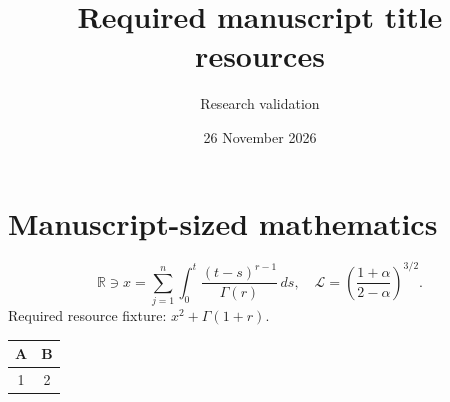 \documentclass[11pt,a4paper]{article}
\begin{document}
\title{Required manuscript title resources}
\author{Research validation}\date{26 November 2026}
\maketitle
\section{Manuscript-sized mathematics}
\begin{equation}
\mathbb{R}\ni x=\sum_{j=1}^{n}\int_0^t\frac{(t-s)^{r-1}}{\Gamma(r)}\,ds,
\quad \mathcal{L}=\left(\frac{1+\alpha}{2-\alpha}\right)^{3/2}.
\end{equation}
Required resource fixture: $x^2+\Gamma(1+r)$.
\begin{tabular}{cc}\toprule A&B\\\midrule 1&2\\\bottomrule\end{tabular}
\end{document}
